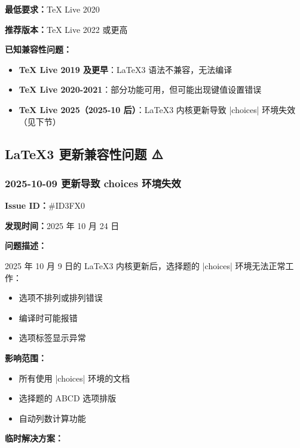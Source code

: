 \textbf{最低要求：}\TeX{} Live 2020

\textbf{推荐版本：}\TeX{} Live 2022 或更高

\textbf{已知兼容性问题：}

\begin{itemize}
  \item \textbf{\TeX{} Live 2019 及更早}：\LaTeX3 语法不兼容，无法编译
  \item \textbf{\TeX{} Live 2020-2021}：部分功能可用，但可能出现键值设置错误
  \item \textbf{\TeX{} Live 2025（2025-10 后）}：\LaTeX3 内核更新导致 |choices| 环境失效（见下节）
\end{itemize}


\subsection{\LaTeX3 更新兼容性问题 ⚠️}

\subsubsection{2025-10-09 更新导致 choices 环境失效}

\textbf{Issue ID：}\#ID3FX0

\textbf{发现时间：}2025 年 10 月 24 日

\textbf{问题描述：}

2025 年 10 月 9 日的 \LaTeX3 内核更新后，选择题的 |choices| 环境无法正常工作：

\begin{itemize}
  \item 选项不排列或排列错误
  \item 编译时可能报错
  \item 选项标签显示异常
\end{itemize}

\textbf{影响范围：}

\begin{itemize}
  \item 所有使用 |choices| 环境的文档
  \item 选择题的 ABCD 选项排版
  \item 自动列数计算功能
\end{itemize}

\textbf{临时解决方案：}

